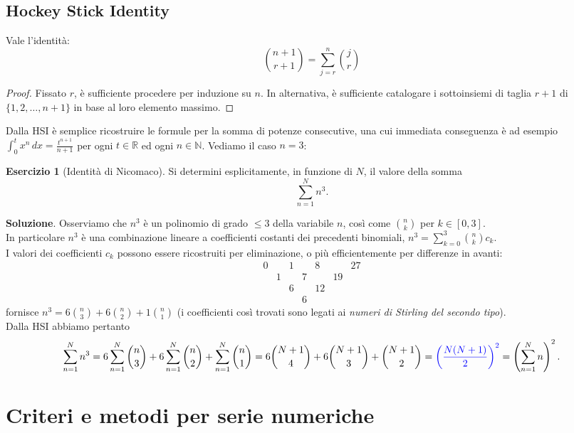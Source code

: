 \documentclass[a4paper,twoside]{article}
\newcommand{\N}{\mathbb{N}}
\newcommand{\R}{\mathbb{R}}
\theoremstyle{definition}
\newtheorem{ex}[theorem]{Esercizio}
\numberwithin{theorem}{section}
\begin{document}
\subsection{Hockey Stick Identity}
Vale l'identità:
$$\binom{n+1}{r+1}=\sum_{j=r}^{n}\binom{j}{r}$$
\begin{proof}
 Fissato $r$, è sufficiente procedere per induzione su $n$. In alternativa, è sufficiente catalogare i sottoinsiemi di taglia $r+1$ di $\{1,2,\ldots,n+1\}$ in base al loro elemento massimo.
\end{proof}
Dalla HSI è semplice ricostruire le formule per la somma di potenze consecutive, una cui immediata conseguenza è ad esempio $\int_{0}^{t}x^n\,dx = \frac{t^{n+1}}{n+1}$ per ogni $t\in\R$ ed ogni $n\in\N$. Vediamo il caso $n=3$:
\begin{ex}[Identità di Nicomaco] Si determini esplicitamente, in funzione di $N$, il valore della somma 
$$ \sum_{n=1}^{N} n^3. $$
 
\end{ex}
\textbf{Soluzione}. Osserviamo che $n^3$ è un polinomio di grado $\leq 3$ della variabile $n$, così come $\binom{n}{k}$ per $k\in[0,3]$.\\ In particolare $n^3$ è una combinazione lineare a coefficienti costanti dei precedenti binomiali, $n^3=\sum_{k=0}^{3}\binom{n}{k}c_k$.\\
I valori dei coefficienti $c_k$ possono essere ricostruiti per eliminazione, o più efficientemente per differenze in avanti:
$$\begin{array}{ccccccc} 0 && 1 && 8 && 27 \\ 
& 1 && 7 && 19 & \\
&& 6 && 12 && \\
&&& 6 &&&
\end{array} $$
fornisce $n^3=6\binom{n}{3}+6\binom{n}{2}+1\binom{n}{1}$ (i coefficienti così trovati sono legati ai \emph{numeri di Stirling del secondo tipo}).\\ Dalla HSI abbiamo pertanto
$$ \sum_{n=1}^{N}n^3 = 6\sum_{n=1}^{N}\binom{n}{3}+6\sum_{n=1}^{N}\binom{n}{2}+\sum_{n=1}^{N}\binom{n}{1}=6\binom{N+1}{4}+6\binom{N+1}{3}+\binom{N+1}{2}={\color{blue}\left(\frac{N(N+1)}{2}\right)^2}=\left(\sum_{n=1}^{N}n\right)^2.$$


    \section{Criteri e metodi per serie numeriche}
\end{document}
